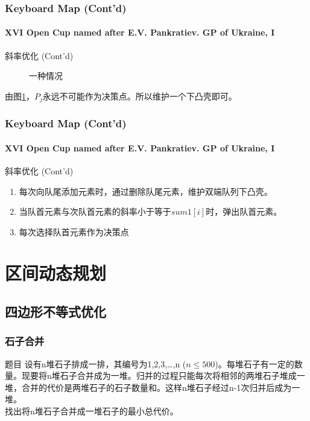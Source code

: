 \documentclass[hyperref={unicode=true}]{beamer}
\theoremstyle{definition}
\theoremstyle{proof}
\begin{document}
\begin{frame}\frametitle{Keyboard Map (Cont'd)}
  \framesubtitle{XVI Open Cup named after E.V. Pankratiev. GP of Ukraine, I}
  \begin{exampleblock}{斜率优化 (Cont'd)}
    \begin{figure}
      \caption{一种情况}\label{fig:line2}
    \end{figure}
    由图\ref{fig:line2}，$P_j$永远不可能作为决策点。所以维护一个下凸壳即可。
  \end{exampleblock}
\end{frame}
\begin{frame}\frametitle{Keyboard Map (Cont'd)}
  \framesubtitle{XVI Open Cup named after E.V. Pankratiev. GP of Ukraine, I}
  \begin{exampleblock}{斜率优化 (Cont'd)}
    \begin{enumerate}
    \item 每次向队尾添加元素时，通过删除队尾元素，维护双端队列下凸壳。
    \item 当队首元素与次队首元素的斜率小于等于$sum1[i]$时，弹出队首元素。
    \item 每次选择队首元素作为决策点
    \end{enumerate}
  \end{exampleblock}
\end{frame}

\section{区间动态规划}
\subsection{四边形不等式优化}
\begin{frame}\frametitle{石子合并}
  \begin{block}{题目}
    设有n堆石子排成一排，其编号为1,2,3,…,n ($n\leq500$)。每堆石子有一定的数量。现要将n堆石子合并成为一堆。归并的过程只能每次将相邻的两堆石子堆成一堆，合并的代价是两堆石子的石子数量和。这样n堆石子经过n-1次归并后成为一堆。\\
    找出将n堆石子合并成一堆石子的最小总代价。
  \end{block}
\end{frame}
\end{document}
